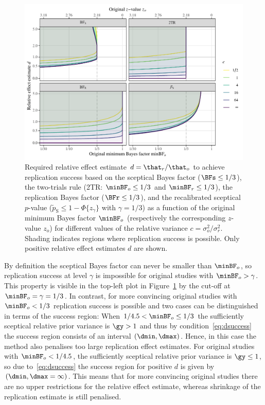 \begin{figure}[!htb]
\begin{knitrout}
\color{fgcolor}
\includegraphics[width=\maxwidth]{images/paper1/plot-success-region-comparison-1}
\end{knitrout}
\caption{Required relative effect estimate $d = \that_{r}/\that_{o}$ to achieve
  replication success based on the sceptical Bayes factor
  ($\BFs \leq 1/3$), the two-trials rule (2TR:
  $\minBF_{o} \leq 1/3$ and $\minBF_{r} \leq 1/3$),
  the replication Bayes factor ($\BFr \leq 1/3$), and the
  recalibrated sceptical $p$-value
  ($\tilde{p}_{\mathrm{S}} \leq 1 - \Phi\{z_{\gamma}\}$ with
  $\gamma = 1/3$) as a function of the original minimum
  Bayes factor $\minBF_{o}$ (respectively the corresponding $z$-value $z_{o}$)
  for different values of the relative variance
  $c = \sigma^{2}_{o}/\sigma^{2}_{r}$. Shading indicates regions where
  replication success is possible. Only positive relative effect estimates $d$
  are shown.}
\label{fig:dcomparison}
\end{figure}

By definition the sceptical Bayes factor can never be smaller than $\minBF_{o}$,
so replication success at level $\gamma$ is impossible for original studies with
$\minBF_{o} > \gamma$. This property is visible in the top-left plot in
Figure~\ref{fig:dcomparison} by the cut-off at $\minBF_{o} = \gamma = 1/3$. In
contrast, for more convincing original studies with $\minBF_{o} < 1/3$
replication success is possible and two cases can be distinguished in terms of
the success region: When $1/4.5 < \minBF_{o} \leq 1/3$ the
sufficiently sceptical relative prior variance is $\gy > 1$ and thus by
condition~\eqref{eq:dsuccess} the success region consists of an interval
$(\dmin, \dmax)$. Hence, in this case the method also penalises too large
replication effect estimates. For original studies with
$\minBF_{o} < 1/4.5$, the sufficiently sceptical relative prior
variance is $\gy \leq 1$, so due to~\eqref{eq:dsuccess} the success region for
positive $d$ is given by $(\dmin, \dmax = \infty)$. This means that for more
convincing original studies there are no upper restrictions for the relative
effect estimate, whereas shrinkage of the replication estimate is still
penalised.

